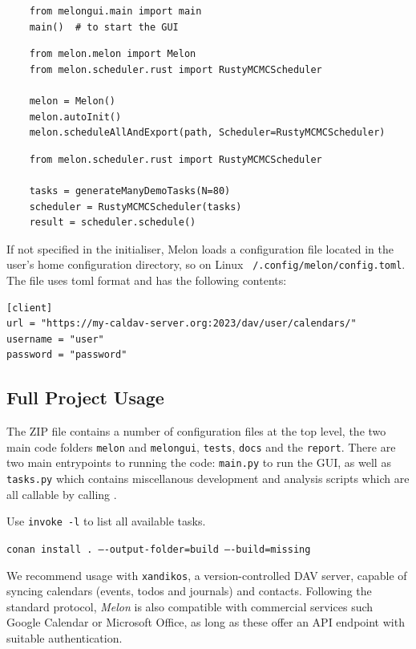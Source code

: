 \documentclass{prettytex/ox/mmsc-special-topic}
\begin{document}
  \begin{verbatim}
    from melongui.main import main
    main()  # to start the GUI
  \end{verbatim}

  \begin{verbatim}
    from melon.melon import Melon
    from melon.scheduler.rust import RustyMCMCScheduler

    melon = Melon()
    melon.autoInit()
    melon.scheduleAllAndExport(path, Scheduler=RustyMCMCScheduler)
  \end{verbatim}

  \begin{verbatim}
    from melon.scheduler.rust import RustyMCMCScheduler

    tasks = generateManyDemoTasks(N=80)
    scheduler = RustyMCMCScheduler(tasks)
    result = scheduler.schedule()
  \end{verbatim}

  If not specified in the initialiser, Melon loads a configuration file located in the user's home configuration directory, so on Linux \texttt{~/.config/melon/config.toml}.
  The file uses \gls{toml} format and has the following contents:
  \begin{verbatim}
[client]
url = "https://my-caldav-server.org:2023/dav/user/calendars/"
username = "user"
password = "password"
  \end{verbatim}

  \subsection{Full Project Usage}
  The ZIP file contains a number of configuration files at the top level, the two main code folders \texttt{melon} and \texttt{melongui}, \texttt{tests}, \texttt{docs} and the \texttt{report}.
  There are two main entrypoints to running the code: \texttt{main.py} to run the GUI, as well as \texttt{tasks.py} which contains miscellanous development and analysis scripts which are all callable by calling .

  Use \texttt{invoke -l} to list all available tasks.

  \texttt{conan install . ----output-folder=build ----build=missing}

  We recommend usage with \texttt{xandikos}, a version-controlled DAV server, capable of syncing calendars (events, todos and journals) and contacts.
  Following the standard protocol, \textit{Melon} is also compatible with commercial services such Google Calendar or Microsoft Office, as long as these offer an API endpoint with suitable authentication.
\end{document}
